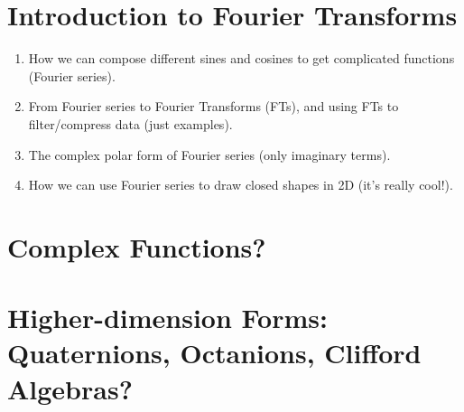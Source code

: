 \documentclass{article}
\newcommand{\iu}{\mathbf{i}\mkern1mu}
\begin{document}

\section{Introduction to Fourier Transforms}
\begin{enumerate}
	\item How we can compose different sines and cosines to get complicated functions (Fourier series).
	\item From Fourier series to Fourier Transforms (FTs), and using FTs to filter/compress data (just examples).
	\item The complex polar form of Fourier series (only imaginary terms).
	\item How we can use Fourier series to draw closed shapes in 2D (it's really cool!).
\end{enumerate}

\section{Complex Functions?}
\section{Higher-dimension Forms: Quaternions, Octanions, Clifford Algebras?}
\end{document}
